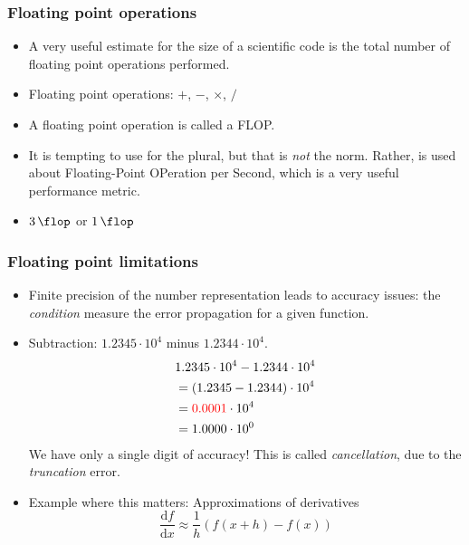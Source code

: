\begin{frame}
  \frametitle{Floating point operations}
  \begin{itemize}
    \item A very useful estimate for the size of a scientific code is the total
      number of floating point operations performed.
    \item Floating point operations: $+$, $-$, $\times$, $/$
    \item A floating point operation is called a FLOP.
    \item It is tempting to use \SI{}{\flop} for the plural, but that is \emph{not} the norm. Rather, \SI{}{\flop} is used about Floating-Point OPeration per Second, which is a very useful
      performance metric.
    \item $\SI{3}{\flop}$ or $\SI{1}{\flop}$
  \end{itemize}
\end{frame}

\begin{frame}
  \frametitle{Floating point limitations}
  \begin{itemize}
  \item Finite precision of the number representation leads to accuracy issues: the \textit{condition} measure the error propagation for a given function.
  \item Subtraction: $1.2345\cdot 10^4$ minus $1.2344\cdot 10^4$.
    \begin{align*}
      & 1.2345 \cdot 10^4 - 1.2344 \cdot 10^4 \\
      &= (1.2345 - 1.2344) \cdot 10^4 \\
      &= \textcolor{red}{0.0001} \cdot 10^4 \\
      &= 1.0000 \cdot 10^0
    \end{align*}
    We have only a single digit of accuracy! This is called \emph{cancellation}, due to the \textit{truncation} error.
  \item Example where this matters: Approximations of derivatives
    \[
      \frac{\text{d}f}{\text{d}x} \approx \frac{1}{h}\left( f(x+h) - f(x) \right)
    \]
  \end{itemize}
\end{frame}

